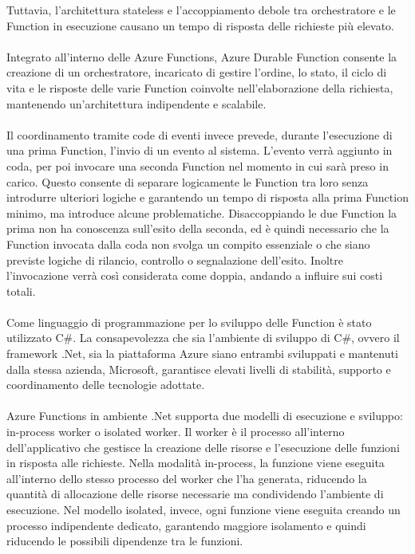 Tuttavia, l'architettura stateless e l'accoppiamento debole tra orchestratore
e le Function in esecuzione causano un tempo di risposta delle richieste più elevato.\\
\\
Integrato all’interno delle Azure Functions,
Azure Durable Function consente la creazione di un orchestratore,
incaricato di gestire l’ordine, lo stato,
il ciclo di vita e le risposte delle varie Function coinvolte nell’elaborazione della richiesta,
mantenendo un'architettura indipendente e scalabile.\\
\\
Il coordinamento tramite code di eventi invece prevede,
durante l'esecuzione di una prima Function, l'invio di un evento al sistema.
L'evento verrà aggiunto in coda,
per poi invocare una seconda Function nel momento in cui sarà preso in carico.
Questo consente di separare logicamente le Function tra loro
senza introdurre ulteriori logiche e garantendo un tempo di risposta alla prima Function minimo,
ma introduce alcune problematiche.
Disaccoppiando le due Function la prima non ha conoscenza sull'esito della seconda,
ed è quindi necessario che la Function invocata dalla coda non svolga un compito essenziale
o che siano previste logiche di rilancio, controllo o segnalazione dell'esito.
Inoltre l'invocazione verrà così considerata come doppia, andando a influire sui costi totali.\\
\\
Come linguaggio di programmazione per lo sviluppo delle Function è stato utilizzato C\#.
La consapevolezza che sia l'ambiente di sviluppo di C\#,
ovvero il framework .Net, sia la piattaforma Azure
siano entrambi sviluppati e mantenuti dalla stessa azienda, Microsoft,
garantisce elevati livelli di stabilità, supporto e coordinamento delle tecnologie adottate.\\
\\
Azure Functions in ambiente .Net supporta due modelli di esecuzione e sviluppo:
in-process worker o isolated worker.
Il worker è il processo all’interno dell’applicativo che gestisce
la creazione delle risorse e l’esecuzione delle funzioni in risposta alle richieste.
Nella modalità in-process,
la funzione viene eseguita all’interno dello stesso processo del worker che l’ha generata,
riducendo la quantità di allocazione delle risorse necessarie
ma condividendo l’ambiente di esecuzione.
Nel modello isolated, invece,
ogni funzione viene eseguita creando un processo indipendente dedicato,
garantendo maggiore isolamento e quindi riducendo le possibili dipendenze tra le funzioni.\\
